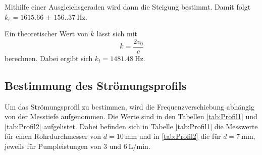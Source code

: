 \noindent Mithilfe einer Ausgleichsgeraden wird dann die Steigung bestimmt.
Damit folgt $k_e=\qty{1615.66(156.37)}{\hertz}$.


Ein theoretischer Wert von $k$ lässt sich mit 
\begin{equation*}
  k=\frac{2 v_0}{c}
\end{equation*}
\noindent berechnen. 
Dabei ergibt sich $k_t=\qty{1481.48}{\hertz}$.


\subsection{Bestimmung des Strömungsprofils}

Um das Strömungsprofil zu bestimmen, wird die Frequenzverschiebung abhängig von der Messtiefe aufgenommen.
Die Werte sind in den Tabellen \ref{tab:Profil1} und \ref{tab:Profil2} aufgelistet.
Dabei befinden sich in Tabelle \ref{tab:Profil1} die Messwerte für einen Rohrdurchmesser von $d=\qty{10}{\milli\meter}$ und in \ref{tab:Profil2} 
die für $d=\qty{7}{\milli\meter}$, jeweils für Pumpleistungen von $3$ und $\qty{6}{\liter\per\minute}$.


